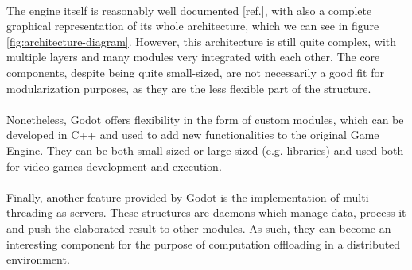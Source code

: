 \\ The engine itself is reasonably well documented [ref.], with also a complete graphical representation of its whole architecture, which we can see in figure \ref{fig:architecture-diagram}. However, this architecture is still quite complex, with multiple layers and many modules very integrated with each other. The core components, despite being quite small-sized, are not necessarily a good fit for modularization purposes, as they are the less flexible part of the structure. \\ \\
Nonetheless, Godot offers flexibility in the form of custom modules, which can be developed in C++ and used to add new functionalities to the original Game Engine. They can be both small-sized or large-sized (e.g. libraries) and used both for video games development and execution. \\ \\
Finally, another feature provided by Godot is the implementation of multi-threading as servers. These structures are daemons which manage data, process it and push the elaborated result to other modules. As such, they can become an interesting component for the purpose of computation offloading in a distributed environment.

